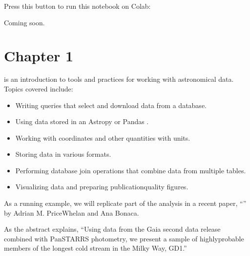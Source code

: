 \documentclass[letterpaper,10pt,english]{sphinxmanual}
\begin{document}
Press this button to run this notebook on Colab:




Coming soon.


\chapter{Chapter 1}
\label{\detokenize{01_query:chapter-1}}\label{\detokenize{01_query::doc}}
 is an introduction to tools and practices for working with astronomical data.  Topics covered include:
\begin{itemize}
\item {} 
Writing queries that select and download data from a database.

\item {} 
Using data stored in an Astropy  or Pandas .

\item {} 
Working with coordinates and other quantities with units.

\item {} 
Storing data in various formats.

\item {} 
Performing database join operations that combine data from multiple tables.

\item {} 
Visualizing data and preparing publication\sphinxhyphen{}quality figures.

\end{itemize}

As a running example, we will replicate part of the analysis in a recent paper, “” by Adrian M. Price\sphinxhyphen{}Whelan and Ana Bonaca.

As the abstract explains, “Using data from the Gaia second data release combined with Pan\sphinxhyphen{}STARRS photometry, we present a sample of highly\sphinxhyphen{}probable members of the longest cold stream in the Milky Way, GD\sphinxhyphen{}1.”
\end{document}
